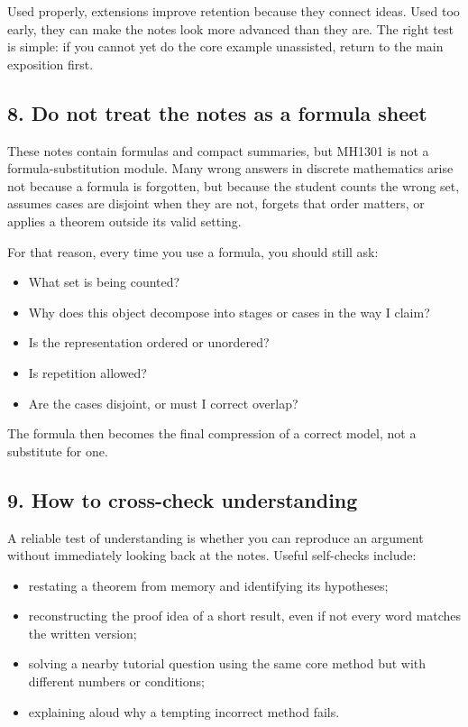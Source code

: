 \documentclass[12pt]{article}
\begin{document}
Used properly, extensions improve retention because they connect ideas. Used too early, they can make the notes look more advanced than they are. The right test is simple: if you cannot yet do the core example unassisted, return to the main exposition first.

\subsection*{8. Do not treat the notes as a formula sheet}

These notes contain formulas and compact summaries, but MH1301 is not a formula-substitution module. Many wrong answers in discrete mathematics arise not because a formula is forgotten, but because the student counts the wrong set, assumes cases are disjoint when they are not, forgets that order matters, or applies a theorem outside its valid setting.

For that reason, every time you use a formula, you should still ask:
\begin{itemize}[leftmargin=*]
    \item What set is being counted?
    \item Why does this object decompose into stages or cases in the way I claim?
    \item Is the representation ordered or unordered?
    \item Is repetition allowed?
    \item Are the cases disjoint, or must I correct overlap?
\end{itemize}

The formula then becomes the final compression of a correct model, not a substitute for one.

\subsection*{9. How to cross-check understanding}

A reliable test of understanding is whether you can reproduce an argument without immediately looking back at the notes. Useful self-checks include:
\begin{itemize}[leftmargin=*]
    \item restating a theorem from memory and identifying its hypotheses;
    \item reconstructing the proof idea of a short result, even if not every word matches the written version;
    \item solving a nearby tutorial question using the same core method but with different numbers or conditions;
    \item explaining aloud why a tempting incorrect method fails.
\end{itemize}
\end{document}
